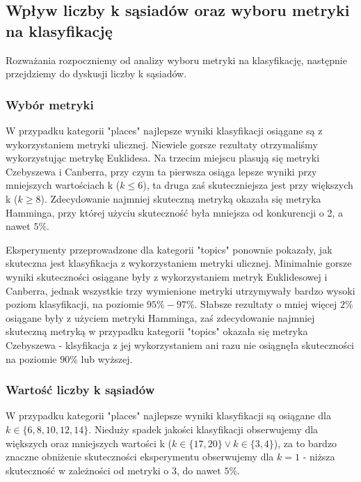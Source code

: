 \documentclass{classrep}
\begin{document}
\subsection{Wpływ liczby k sąsiadów oraz wyboru metryki na klasyfikację}
Rozważania rozpoczniemy od analizy wyboru metryki na klasyfikację, następnie przejdziemy do dyskusji liczby k sąsiadów.

\subsubsection{Wybór metryki}
W przypadku kategorii "places" najlepsze wyniki klasyfikacji osiągane są z wykorzystaniem metryki ulicznej. Niewiele gorsze rezultaty otrzymaliśmy wykorzystując metrykę Euklidesa. Na trzecim miejscu plasują się metryki Czebyszewa i Canberra, przy czym ta pierwsza osiąga lepsze wyniki przy mniejszych wartościach k ($k\leq6$), ta druga zaś skuteczniejsza jest przy większych k ($k\geq8$). Zdecydowanie najmniej skuteczną metryką okazała się metryka Hamminga, przy której użyciu skuteczność była mniejsza od konkurencji o 2, a nawet $5\%$. \newline

Eksperymenty przeprowadzone dla kategorii "topics" ponownie pokazały, jak skuteczna jest klasyfikacja z wykorzystaniem metryki ulicznej. Minimalnie gorsze wyniki skuteczności osiągane były z wykorzystaniem metryk Euklidesowej i Canberra, jednak wszystkie trzy wymienione metryki utrzymywały bardzo wysoki poziom klasyfikacji, na poziomie $95\%-97\%$. Słabsze rezultaty o mniej więcej $2\%$ osiągane były z użyciem metryki Hamminga, zaś zdecydowanie najmniej skuteczną metryką w przypadku kategorii "topics" okazała się metryka Czebyszewa - klsyfikacja z jej wykorzystaniem ani razu nie osiągnęła skuteczności na poziomie $90\%$ lub wyższej. \newline

\subsubsection{Wartość liczby k sąsiadów}
W przypadku kategorii "places" najlepsze wyniki klasyfikacji są osiągane dla $k \in \{6, 8, 10, 12, 14\}$. Nieduży spadek jakości klasyfikacji obserwujemy dla większych oraz mniejszych wartości k ($k\in \{17, 20\} \lor k \in \{3, 4\}$), za to bardzo znaczne obniżenie skuteczności eksperymentu obserwujemy dla $k=1$ - niższa skuteczność w zależności od metryki o 3, do nawet $5\%$. \newline
\end{document}
